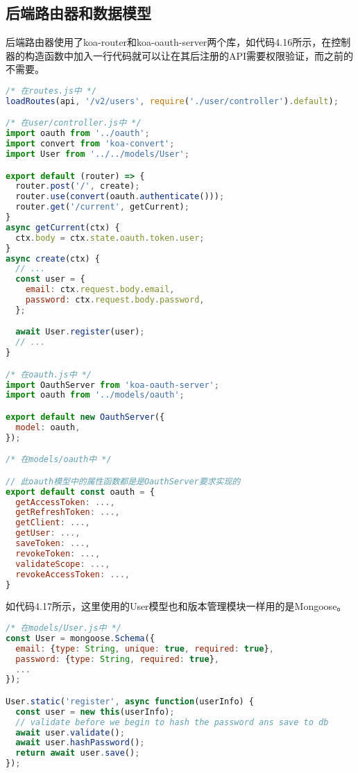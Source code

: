 \subsection{后端路由器和数据模型}
后端路由器使用了koa-router和koa-oauth-server两个库，如代码4.16所示，在控制器的构造函数中加入一行代码就可以让在其后注册的API需要权限验证，而之前的不需要。
\begin{lstlisting}[language={JavaScript}, caption={Smart City和Smart Home模块后端权限控制相关代码}]
/* 在routes.js中 */
loadRoutes(api, '/v2/users', require('./user/controller').default);

/* 在user/controller.js中 */
import oauth from '../oauth';
import convert from 'koa-convert';
import User from '../../models/User';

export default (router) => {
  router.post('/', create);
  router.use(convert(oauth.authenticate()));
  router.get('/current', getCurrent);
}
async getCurrent(ctx) {
  ctx.body = ctx.state.oauth.token.user;
}
async create(ctx) {
  // ...
  const user = {
    email: ctx.request.body.email,
    password: ctx.request.body.password,
  };

  await User.register(user);
  // ...
}

/* 在oauth.js中 */
import OauthServer from 'koa-oauth-server';
import oauth from '../models/oauth';

export default new OauthServer({
  model: oauth,
});

/* 在models/oauth中 */

// 此oauth模型中的属性函数都是是OauthServer要求实现的
export default const oauth = {
  getAccessToken: ...,
  getRefreshToken: ...,
  getClient: ...,
  getUser: ...,
  saveToken: ...,
  revokeToken: ...,
  validateScope: ...,
  revokeAccessToken: ...,
}
\end{lstlisting}

如代码4.17所示，这里使用的User模型也和版本管理模块一样用的是Mongoose。
\begin{lstlisting}[language={JavaScript}, caption={Smart City和Smart Home模块后端User模型}]
/* 在models/User.js中 */
const User = mongoose.Schema({
  email: {type: String, unique: true, required: true},
  password: {type: String, required: true},
  ...
});

User.static('register', async function(userInfo) {
  const user = new this(userInfo);
  // validate before we begin to hash the password ans save to db
  await user.validate();
  await user.hashPassword();
  return await user.save();
});
\end{lstlisting}

